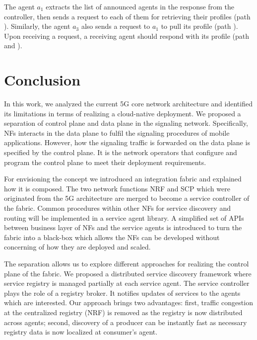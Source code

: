\documentclass[conference]{IEEEtran}
\begin{document}
The agent $a_1$ extracts the list of announced agents in the response from the
controller, then sends a request to each of them for retrieving their profiles
(path ). Similarly, the agent $a_3$ also sends a request to $a_1$ to pull
its profile (path ). Upon receiving a request, a receiving agent
should respond with its profile (path  and  ).



\section{Conclusion\label{sec:conc}}

In this work, we analyzed the current 5G core network architecture and
identified its limitations in terms of realizing a cloud-native deployment. We
proposed a separation of control plane and data plane in the signaling network.
Specifically, NFs interacts in the data plane to fulfil the signaling
procedures of mobile applications. However, how the signaling traffic is
forwarded on the data plane is specified by the control plane. It is the
network operators that configure and program the control plane to meet their
deployment requirements.

For envisioning the concept we introduced an integration fabric and explained
how it is composed. The two network functions NRF and SCP which were originated
from the 5G architecture are merged to become a service controller of the
fabric. Common procedures within other NFs for service discovery and routing
will be implemented in a service agent library. A simplified set of APIs
between business layer of NFs and the service agents is introduced to turn the
fabric into a black-box which allows the NFs can be developed without
concerning of how they are deployed and scaled.

The separation allows us to explore different approaches for realizing the
control plane of the fabric. We proposed a distributed service discovery
framework where service registry is managed partially at each service agent.
The service controller plays the role of a registry broker. It notifies updates
of services to the agents which are interested. Our approach brings two
advantages: first, traffic congestion at the centralized registry (NRF) is
removed as the registry is now distributed across agents; second, discovery of
a producer can be instantly fast as necessary registry data is now localized
at consumer's agent.
\end{document}
